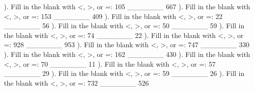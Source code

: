 \documentclass{article}%
\begin{document}
\newline%
\newline%
). Fill in the blank with <, >, or =: 105 \_\_\_\_\_\_\_ 667%
\newline%
\newline%
). Fill in the blank with <, >, or =: 153 \_\_\_\_\_\_\_ 409%
\newline%
\newline%
). Fill in the blank with <, >, or =: 22 \_\_\_\_\_\_\_ 56%
\newline%
\newline%
). Fill in the blank with <, >, or =: 50 \_\_\_\_\_\_\_ 59%
\newline%
\newline%
). Fill in the blank with <, >, or =: 74 \_\_\_\_\_\_\_ 22%
\newline%
\newline%
). Fill in the blank with <, >, or =: 928 \_\_\_\_\_\_\_ 953%
\newline%
\newline%
). Fill in the blank with <, >, or =: 747 \_\_\_\_\_\_\_ 330%
\newline%
\newline%
). Fill in the blank with <, >, or =: 162 \_\_\_\_\_\_\_ 430%
\newline%
\newline%
). Fill in the blank with <, >, or =: 70 \_\_\_\_\_\_\_ 11%
\newline%
\newline%
). Fill in the blank with <, >, or =: 57 \_\_\_\_\_\_\_ 29%
\newline%
\newline%
). Fill in the blank with <, >, or =: 59 \_\_\_\_\_\_\_ 26%
\newline%
\newline%
). Fill in the blank with <, >, or =: 732 \_\_\_\_\_\_\_ 526%
\newline%
\end{document}
